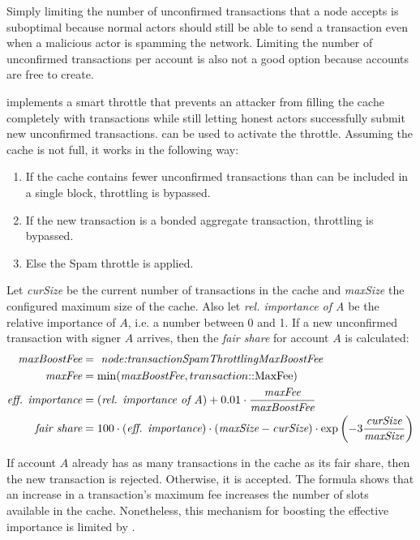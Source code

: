Simply limiting the number of unconfirmed transactions that a node accepts is suboptimal because normal actors should still be able to send a transaction even when a malicious actor is spamming the network.
Limiting the number of unconfirmed transactions per account is also not a good option because accounts are free to create.

\codenamespace implements a smart throttle that prevents an attacker from filling the cache completely with transactions while still letting honest actors successfully submit new unconfirmed transactions.
 can be used to activate the throttle.
Assuming the cache is not full, it works in the following way:
\begin{enumerate}
	\item{If the cache contains fewer unconfirmed transactions than can be included in a single block, throttling is bypassed.}
	\item{If the new transaction is a bonded aggregate transaction, throttling is bypassed.}
	\item{Else the Spam throttle is applied.}
\end{enumerate}

Let \textit{curSize} be the current number of transactions in the cache and \textit{maxSize} the configured maximum size of the cache.
Also let \textit{rel. importance of A} be the relative importance of $A$, i.e. a number between 0 and 1.
If a new unconfirmed transaction with signer $A$ arrives, then the \textit{fair share} for account $A$ is calculated:
\begin{align*}
	\textit{maxBoostFee} &= \text{\nemsetting{node}{transactionSpamThrottlingMaxBoostFee}} \\
	\textit{maxFee} &= \min(\textit{maxBoostFee}, \structField{transaction}{MaxFee}) \\
	\textit{eff. importance} &= (\textit{rel. importance of A}) + 0.01 \cdot \frac{\textit{maxFee}}{\textit{maxBoostFee}} \\
	\textit{fair share} &= 100 \cdot (\textit{eff. importance}) \cdot (\textit{maxSize} - \textit{curSize}) \cdot \exp\left(-3 \frac{\textit{curSize}}{\textit{maxSize}}\right)
\end{align*}

If account $A$ already has as many transactions in the cache as its fair share, then the new transaction is rejected.
Otherwise, it is accepted.
The formula shows that an increase in a transaction's maximum fee increases the number of slots available in the cache.
Nonetheless, this mechanism for boosting the effective importance is limited by .

